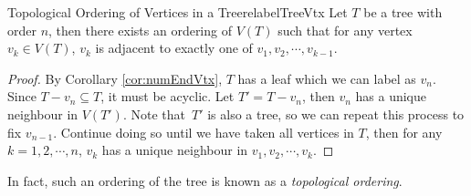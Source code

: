 \documentclass[math]{amznotes}
\theoremstyle{remark}
\newcommand{\0}{\mathbf{0}}
\newcommand{\1}{\mathbf{1}}
\begin{document}
\begin{probox}{Topological Ordering of Vertices in a Tree}{relabelTreeVtx}
    Let $T$ be a tree with order $n$, then there exists an ordering of $V(T)$ such that for any vertex~$v_k \in V(T)$, $v_k$ is adjacent to exactly one of $v_1, v_2, \cdots, v_{k - 1}$.
    \tcblower
    \begin{proof}
        By Corollary \ref{cor:numEndVtx}, $T$ has a leaf which we can label as $v_n$. Since $T - v_n \subseteq T$, it must be acyclic. Let $T' = T - v_n$, then $v_n$ has a unique neighbour in $V(T')$. Note that~$T'$ is also a tree, so we can repeat this process to fix $v_{n - 1}$. Continue doing so until we have taken all vertices in $T$, then for any $k = 1, 2, \cdots, n$, $v_k$ has a unique neighbour in $v_1, v_2, \cdots, v_k$.
    \end{proof}
\end{probox}
In fact, such an ordering of the tree is known as a \textit{topological ordering}. 
\end{document}
